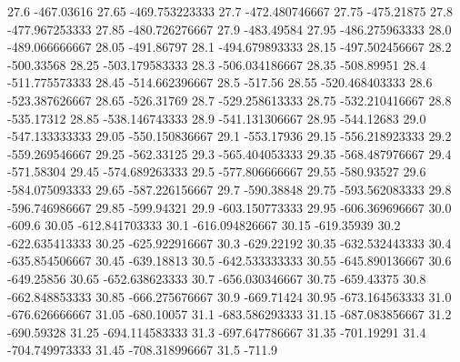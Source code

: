            27.6       -467.03616
          27.65   -469.753223333
           27.7   -472.480746667
          27.75       -475.21875
           27.8   -477.967253333
          27.85   -480.726276667
           27.9       -483.49584
          27.95   -486.275963333
           28.0   -489.066666667
          28.05       -491.86797
           28.1   -494.679893333
          28.15   -497.502456667
           28.2       -500.33568
          28.25   -503.179583333
           28.3   -506.034186667
          28.35       -508.89951
           28.4   -511.775573333
          28.45   -514.662396667
           28.5          -517.56
          28.55   -520.468403333
           28.6   -523.387626667
          28.65       -526.31769
           28.7   -529.258613333
          28.75   -532.210416667
           28.8       -535.17312
          28.85   -538.146743333
           28.9   -541.131306667
          28.95       -544.12683
           29.0   -547.133333333
          29.05   -550.150836667
           29.1       -553.17936
          29.15   -556.218923333
           29.2   -559.269546667
          29.25       -562.33125
           29.3   -565.404053333
          29.35   -568.487976667
           29.4       -571.58304
          29.45   -574.689263333
           29.5   -577.806666667
          29.55       -580.93527
           29.6   -584.075093333
          29.65   -587.226156667
           29.7       -590.38848
          29.75   -593.562083333
           29.8   -596.746986667
          29.85       -599.94321
           29.9   -603.150773333
          29.95   -606.369696667
           30.0           -609.6
          30.05   -612.841703333
           30.1   -616.094826667
          30.15       -619.35939
           30.2   -622.635413333
          30.25   -625.922916667
           30.3       -629.22192
          30.35   -632.532443333
           30.4   -635.854506667
          30.45       -639.18813
           30.5   -642.533333333
          30.55   -645.890136667
           30.6       -649.25856
          30.65   -652.638623333
           30.7   -656.030346667
          30.75       -659.43375
           30.8   -662.848853333
          30.85   -666.275676667
           30.9       -669.71424
          30.95   -673.164563333
           31.0   -676.626666667
          31.05       -680.10057
           31.1   -683.586293333
          31.15   -687.083856667
           31.2       -690.59328
          31.25   -694.114583333
           31.3   -697.647786667
          31.35       -701.19291
           31.4   -704.749973333
          31.45   -708.318996667
           31.5           -711.9
